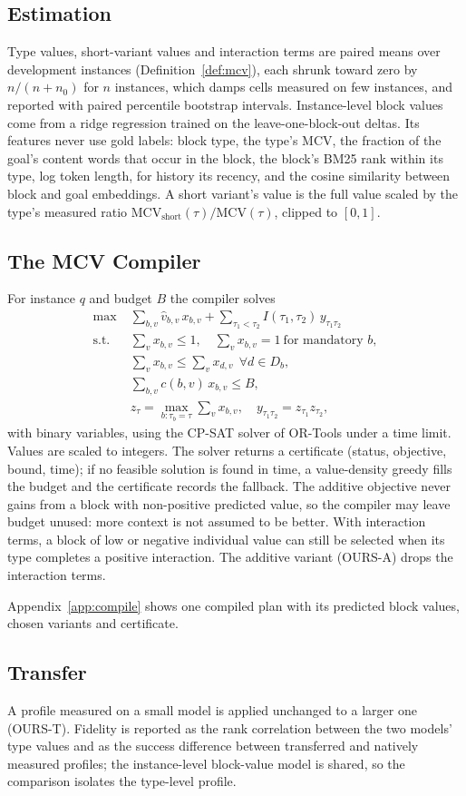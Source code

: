 \subsection{Estimation}
Type values, short-variant values and interaction terms are paired means over development instances (Definition~\ref{def:mcv}), each
shrunk toward zero by $n/(n+n_0)$ for $n$ instances, which damps cells measured on few instances, and reported with
paired percentile bootstrap intervals. Instance-level block values come from a ridge regression trained on the
leave-one-block-out deltas. Its features never use gold labels: block type, the type's MCV, the fraction of the goal's
content words that occur in the block, the block's BM25 rank within its type, log token length, for history its
recency, and the cosine similarity between block and goal embeddings. A short variant's value is the full value scaled by the type's measured ratio
$\mathrm{MCV}_{\mathrm{short}}(\tau)/\mathrm{MCV}(\tau)$, clipped to $[0,1]$.

\subsection{The MCV Compiler}
For instance $q$ and budget $B$ the compiler solves
\begin{align*}
\max\;&\textstyle\sum_{b,v}\hat v_{b,v}\,x_{b,v}+\sum_{\tau_1<\tau_2}I(\tau_1,\tau_2)\,y_{\tau_1\tau_2}\\
\text{s.t.}\;&\textstyle\sum_v x_{b,v}\le 1,\quad \sum_v x_{b,v}=1\ \text{for mandatory } b,\\
&\textstyle\sum_v x_{b,v}\le\sum_v x_{d,v}\ \ \forall d\in D_b,\\
&\textstyle\sum_{b,v}c(b,v)\,x_{b,v}\le B,\\
&z_\tau=\max_{b:\tau_b=\tau}\textstyle\sum_v x_{b,v},\quad y_{\tau_1\tau_2}=z_{\tau_1}z_{\tau_2},
\end{align*}
with binary variables, using the CP-SAT solver of OR-Tools under a time limit. Values are scaled to integers. The solver
returns a certificate (status, objective, bound, time); if no feasible solution is found in time, a value-density greedy
fills the budget and the certificate records the fallback. The additive objective never gains from a block with non-positive predicted value, so the compiler may leave budget
unused: more context is not assumed to be better. With interaction terms, a block of low or negative individual value
can still be selected when its type completes a positive interaction. The additive variant (OURS-A) drops
the interaction terms.

Appendix~\ref{app:compile} shows one compiled plan with its predicted block values, chosen variants and certificate.

\subsection{Transfer}
A profile measured on a small model is applied unchanged to a larger one (OURS-T). Fidelity is reported as the rank
correlation between the two models' type values and as the success difference between transferred and natively measured
profiles; the instance-level block-value model is shared, so the comparison isolates the type-level profile.
